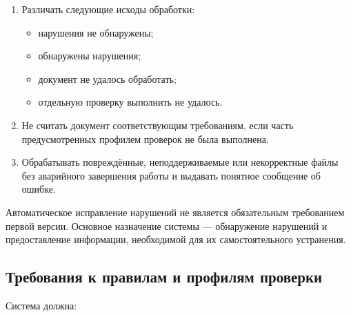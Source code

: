 \documentclass[a4paper,14pt]{extarticle}
\begin{document}
\begin{enumerate}
    \item Различать следующие исходы обработки:
    \begin{itemize}
        \item нарушения не обнаружены;
        \item обнаружены нарушения;
        \item документ не удалось обработать;
        \item отдельную проверку выполнить не удалось.
    \end{itemize}

    \item Не считать документ соответствующим требованиям, если часть предусмотренных профилем проверок не была выполнена.

    \item Обрабатывать повреждённые, неподдерживаемые или некорректные файлы без аварийного завершения работы и выдавать понятное сообщение об ошибке.
\end{enumerate}

Автоматическое исправление нарушений не является обязательным требованием первой версии. Основное назначение системы --- обнаружение нарушений и предоставление информации, необходимой для их самостоятельного устранения.

\subsection{Требования к правилам и профилям проверки}

Система должна:
\end{document}
